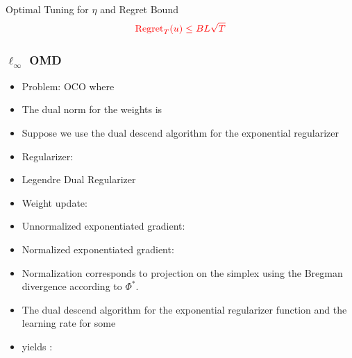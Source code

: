 \documentclass{beamer}
\begin{document}
\begin{small}
\begin{frame}{Optimal Tuning for \(\eta\) and Regret Bound}
\begin{equation*}
\textcolor{red}{\text{Regret}_T(u) \leq B L \sqrt{T}}
\end{equation*}
\end{frame}

\begin{frame}
  \frametitle{$\ell_{\infty}$ OMD}
  \begin{itemize}
  \item Problem: OCO where  
  \item The dual norm for the weights is 
  \item Suppose we use the dual descend algorithm for the exponential regularizer
  \item Regularizer: 
  \item Legendre Dual Regularizer 
  \end{itemize}
\end{frame}
\begin{frame}
  \begin{itemize}
  \item Weight update:
    
  \item Unnormalized exponentiated gradient: 
  \item Normalized exponentiated gradient:
  \end{itemize}
\end{frame}

\begin{frame}
  \begin{itemize}
  \item Normalization corresponds to projection on the simplex
    using the Bregman divergence according to $\Phi^*$. 
  \item The dual descend algorithm for the exponential regularizer
    function \R{$\Phi$} and the learning rate   for some 
  \item yields :\\
  \end{itemize}
\end{frame}
\end{small}
\end{document}
